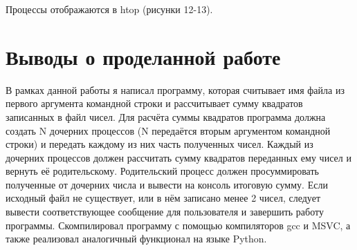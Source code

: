 \FloatBarrier

Процессы отображаются в htop (рисунки 12-13).

\FloatBarrier
\clearpage

\section{Выводы о проделанной работе}
В рамках данной работы я написал программу, которая считывает имя файла из первого аргумента командной строки и рассчитывает сумму квадратов записанных в файл чисел. Для расчёта суммы квадратов программа должна создать N дочерних процессов (N передаётся вторым аргументом командной строки) и передать каждому из них часть полученных чисел. Каждый из дочерних процессов должен рассчитать сумму квадратов переданных ему чисел и вернуть её родительскому. Родительский процесс должен просуммировать полученные от дочерних числа и вывести на консоль итоговую сумму. Если исходный файл не существует, или в нём записано менее 2 чисел, следует вывести соответствующее сообщение для пользователя и завершить работу программы. Скомпилировал программу с помощью компиляторов gcc и MSVC, а также реализовал аналогичный функционал на языке Python.

\clearpage